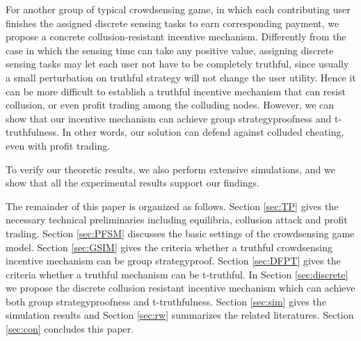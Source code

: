 \documentclass[conference]{IEEEtran}
\theoremstyle{definition}
\begin{document}
\bolditem For another group of typical crowdsensing game, in which each contributing user finishes the assigned discrete sensing tasks to earn corresponding payment, we propose a concrete collusion-resistant incentive mechanism. %
{\color{black}Differently from the case in which the sensing time can take any positive value, assigning discrete sensing tasks may let each user not have to be completely truthful, since usually a small perturbation on truthful strategy will not change the user utility. Hence it can be more difficult to establish a truthful incentive mechanism that can resist collusion, or even profit trading among the colluding nodes. 
However, we can show that our incentive mechanism can achieve group strategyproofness and t-truthfulness. In other words, our solution can defend against colluded cheating, even with profit trading.}


\bolditem To verify our theoretic results, we also perform extensive simulations, and we show that all the experimental results support our findings.

{\color{black}
The remainder of this paper is organized as follows. Section \ref{sec:TP} gives the necessary technical preliminaries including equilibria, collusion attack and profit trading. Section \ref{sec:PFSM} discusses the basic settings of the crowdsensing game model. Section \ref{sec:GSIM} gives the criteria whether a truthful crowdsensing incentive mechanism can be group strategyproof. Section \ref{sec:DFPT} gives the criteria whether a truthful mechanism can be t-truthful. 
In Section \ref{sec:discrete} we propose the discrete collusion resistant incentive mechanism which can achieve both group strategyproofness and t-truthfulness. 
Section \ref{sec:sim} gives the simulation results and Section \ref{sec:rw} summarizes the related literatures. Section \ref{sec:con} concludes this paper.
}
\end{document}
